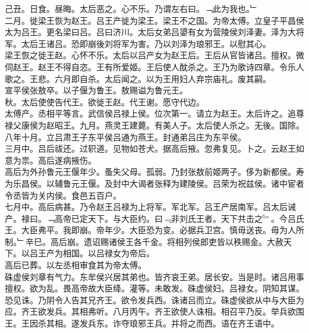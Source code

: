 \documentclass{zhvt-classic}
\begin{document}
\hspace*{2em}己丑。日食。昼晦。太后恶之。心不乐。乃谓左右曰。﹁此为我也。﹂\\
\hspace*{2em}二月。徙梁王恢为赵王。吕王产徙为梁王。梁王不之国。为帝太傅。立皇子平昌侯太为吕王。更名梁曰吕。吕曰济川。太后女弟吕嬃有女为营陵侯刘泽妻。泽为大将军。太后王诸吕。恐即崩後刘将军为害。乃以刘泽为琅邪王。以慰其心。\\
\hspace*{2em}梁王恢之徙王赵。心怀不乐。太后以吕产女为赵王后。王后从官皆诸吕。擅权。微伺赵王。赵王不得自恣。王有所爱姬。王后使人酖杀之。王乃为歌诗四章。令乐人歌之。王悲。六月即自杀。太后闻之。以为王用妇人弃宗庙礼。废其嗣。\\
\hspace*{2em}宣平侯张敖卒。以子偃为鲁王。敖赐谥为鲁元王。\\
\hspace*{2em}秋。太后使使告代王。欲徙王赵。代王谢。愿守代边。\\
\hspace*{2em}太傅产。丞相平等言。武信侯吕禄上侯。位次第一。请立为赵王。太后许之。追尊禄父康侯为赵昭王。九月。燕灵王建薨。有美人子。太后使人杀之。无後。国除。八年十月。立吕肃王子东平侯吕通为燕王。封通弟吕庄为东平侯。\\
\hspace*{2em}三月中。吕后祓还。过轵道。见物如苍犬。据高后掖。忽弗复见。卜之。云赵王如意为祟。高后遂病掖伤。\\
\hspace*{2em}高后为外孙鲁元王偃年少。蚤失父母。孤弱。乃封张敖前姬两子。侈为新都侯。寿为乐昌侯。以辅鲁元王偃。及封中大谒者张释为建陵侯。吕荣为祝兹侯。诸中宦者令丞皆为关内侯。食邑五百户。\\
\hspace*{2em}七月中。高后病甚。乃令赵王吕禄为上将军。军北军。吕王产居南军。吕太后诫产。禄曰。﹁高帝已定天下。与大臣约。曰﹃非刘氏王者。天下共击之﹄。今吕氏王。大臣弗平。我即崩。帝年少。大臣恐为变。必据兵卫宫。慎毋送丧。毋为人所制。﹂辛巳。高后崩。遗诏赐诸侯王各千金。将相列侯郎吏皆以秩赐金。大赦天下。以吕王产为相国。以吕禄女为帝后。\\
\hspace*{2em}高后已葬。以左丞相审食其为帝太傅。\\
\hspace*{2em}硃虚侯刘章有气力。东牟侯兴居其弟也。皆齐哀王弟。居长安。当是时。诸吕用事擅权。欲为乱。畏高帝故大臣绛。灌等。未敢发。硃虚侯妇。吕禄女。阴知其谋。恐见诛。乃阴令人告其兄齐王。欲令发兵西。诛诸吕而立。硃虚侯欲从中与大臣为应。齐王欲发兵。其相弗听。八月丙午。齐王欲使人诛相。相召平乃反。举兵欲围王。王因杀其相。遂发兵东。诈夺琅邪王兵。并将之而西。语在齐王语中。\\
\end{document}
